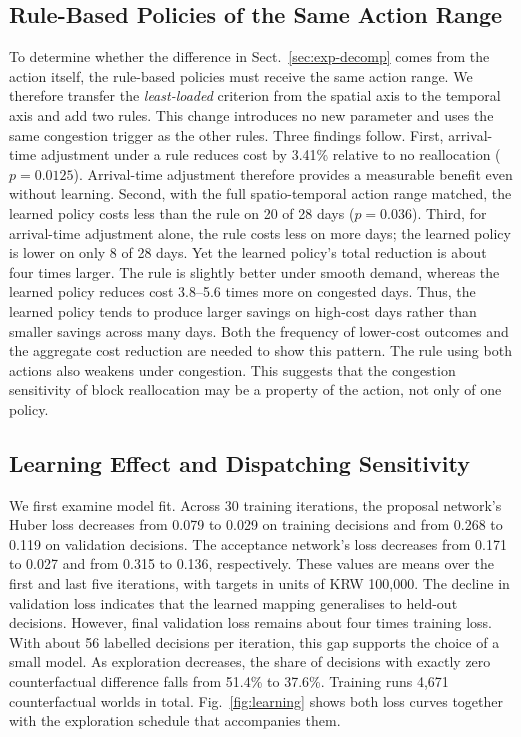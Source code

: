 \subsection{Rule-Based Policies of the Same Action Range}
\label{sec:exp-rules}
To determine whether the difference in Sect.~\ref{sec:exp-decomp} comes
from the action itself, the rule-based policies must receive the same
action range. We therefore transfer the \emph{least-loaded} criterion
from the spatial axis to the temporal axis and add two rules. This change
introduces no new parameter and uses the same congestion trigger as the
other rules. Three findings follow. First, arrival-time adjustment under
a rule reduces cost by 3.41\% relative to no reallocation
($p=0.0125$). Arrival-time adjustment therefore provides a measurable benefit even
without learning. Second,
with the full spatio-temporal action range matched, the learned policy
costs less than the rule on 20 of 28 days ($p=0.036$). Third, for
arrival-time adjustment alone, the rule costs less on more days; the
learned policy is lower on only 8 of 28 days. Yet the learned policy's
total reduction is about four times larger. The rule is slightly better
under smooth demand, whereas the learned policy reduces cost 3.8--5.6
times more on congested days. Thus, the learned policy tends to produce
larger savings on high-cost days rather than smaller savings across many
days. Both the frequency of lower-cost outcomes and the aggregate cost
reduction are needed to show this pattern. The rule using both actions also weakens under congestion. This
suggests that the congestion sensitivity of block reallocation may be a
property of the action, not only of one policy.

\subsection{Learning Effect and Dispatching Sensitivity}
\label{sec:exp-learning}
We first examine model fit. Across 30 training iterations, the proposal
network's Huber loss decreases from 0.079 to 0.029 on training decisions
and from 0.268 to 0.119 on validation decisions. The acceptance
network's loss decreases from 0.171 to 0.027 and from 0.315 to 0.136,
respectively. These values are means over the first and last five
iterations, with targets in units of KRW 100{,}000. The decline in
validation loss indicates that the learned mapping generalises to
held-out decisions.
However, final validation loss remains about four times training loss.
With about 56 labelled decisions per iteration, this gap supports the
choice of a small model. As exploration decreases, the share of
decisions with exactly zero counterfactual difference falls from 51.4\%
to 37.6\%. Training runs 4{,}671 counterfactual worlds in total.
Fig.~\ref{fig:learning} shows both loss curves together with the
exploration schedule that accompanies them.

